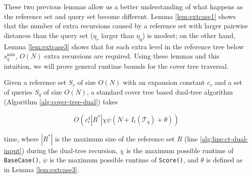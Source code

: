 These two previous lemmas allow us a better understanding of what happens as the
reference set and query set become different.  Lemma \ref{lem:extcase1} shows
that the number of extra recursions caused by a reference set with larger
pairwise distances than the query set ($\eta_r$ larger than $\eta_q$) is modest;
on the other hand, Lemma \ref{lem:extcase3} shows that for each extra level in
the reference tree below $s_q^{\min}$, $O(N)$ extra recursions are required.
Using these lemmas and this intuition, we will prove general runtime bounds for
the cover tree traversal.

\begin{thm}
\label{thm:ct-runtime}
Given a reference set $S_r$ of size $O(N)$ with an expansion constant $c_r$ and a
set of queries $S_q$ of size $O(N)$, a standard cover tree based dual-tree
algorithm (Algorithm \ref{alg:cover-tree-dual}) takes

\begin{equation}
O\left(c_r^4 | R^* | \chi \psi (N + I_t(\mathscr{T}_q) + \theta)\right)
\end{equation}

\noindent time, where $ | R^* | $ is the maximum size of the reference set $R$
(line \ref{alg:line:ct-dual-input}) during the dual-tree recursion, $\chi$ is
the maximum possible runtime of \texttt{BaseCase()}, $\psi$ is the maximum
possible runtime of \texttt{Score()}, and $\theta$ is defined as in Lemma
\ref{lem:extcase3}.
\end{thm}

